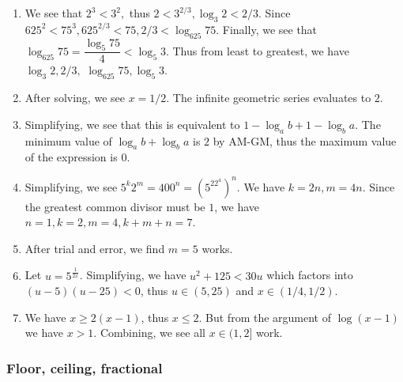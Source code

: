 \documentclass[10pt,paper=letter]{scrartcl}
\begin{document}
\begin{enumerate}

\item We see that $2^3 < 3^2,$ thus $2 < 3^{2/3}, \log_3 2 < 2/3$. Since $625^2 < 75^3, 625^{2/3} < 75, 2/3 < \log_{625} 75$. Finally, we see that $\log_{625} 75 = \dfrac{\log_5 75}{4} < \log_5 3$. Thus from least to greatest, we have $\log_3 2, 2/3,$ $\log_{625} 75, \log_5 3$.

\item After solving, we see $x = 1/2$. The infinite geometric series evaluates to $2$.

\item Simplifying, we see that this is equivalent to $1 - \log_a b + 1 - \log_b a$. The minimum value of $\log_a b + \log_b a$ is $2$ by AM-GM, thus the maximum value of the expression is $0$.

\item Simplifying, we see $5^k2^m = 400^n = (5^22^4)^n$. We have $k = 2n, m = 4n$. Since the greatest common divisor must be $1$, we have $n = 1, k = 2, m = 4, k + m + n = 7$.

\item After trial and error, we find $m = 5$ works.

\item Let $u = 5^{\frac{1}{2x}}$. Simplifying, we have $u^2 + 125 < 30u$ which factors into $(u - 5)(u - 25) < 0$, thus $u \in (5, 25)$ and $x \in (1/4, 1/2)$.

\item We have $x \geq 2(x - 1)$, thus $x \leq 2$. But from the argument of $\log (x - 1)$ we have $x > 1$. Combining, we see all $x \in (1, 2]$ work.

\end{enumerate}

\subsubsection*{Floor, ceiling, fractional}
\end{document}
